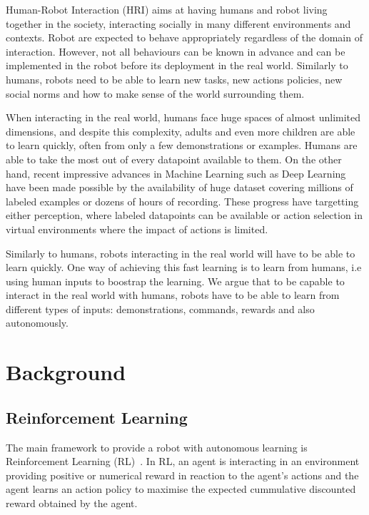 \documentclass[letterpaper]{article} %
\begin{document}
Human-Robot Interaction (HRI) aims at having humans and robot living together
in the society, interacting socially in many different environments and
contexts. Robot are expected to behave appropriately regardless of the domain
of interaction. However, not all behaviours can be known in advance and can be
implemented in the robot before its deployment in the real world. Similarly to
 humans, robots need
to be able to learn new tasks, new actions policies, new social norms and how
to make sense of the world surrounding them.

When interacting in the real world, humans face huge spaces of almost unlimited
dimensions, and despite this complexity, adults and even more children are able
to learn quickly, often from only a few demonstrations or examples. Humans are
able to take the most out of every datapoint available to them. On the other
hand, recent impressive advances in Machine Learning such as Deep Learning~\cite{lecun2015deep}
have been made possible by the availability of huge dataset covering millions
of labeled examples or dozens of hours of recording. These progress have
targetting either perception, where labeled datapoints can be available or
action selection in virtual environments where the impact of actions is
limited.

Similarly to humans, robots interacting in the real world will have to be able
to learn quickly. One way of achieving this fast learning is to learn from
humans, i.e using human inputs to boostrap the learning. We argue that to be
capable to interact in the real world with humans, robots have to be able to
learn from different types of inputs: demonstrations, commands, rewards and 
also autonomously.


\section{Background}
\subsection{Reinforcement Learning}

The main framework to provide a robot with autonomous learning is Reinforcement
Learning (RL)~\cite{kober2013reinforcement,sutton1998reinforcement}. In RL, an
agent is interacting in an environment
providing positive or numerical reward in reaction to the agent's actions and
the agent learns an action policy to maximise the expected cummulative discounted
reward obtained by the agent.
\end{document}
